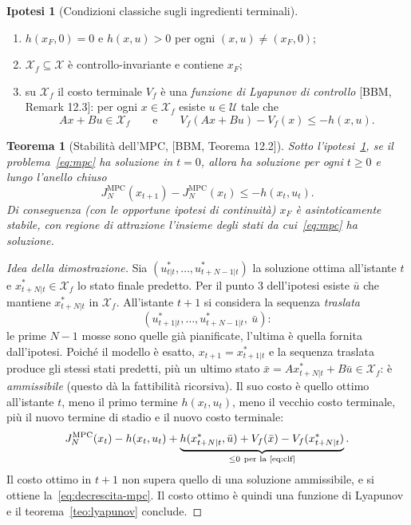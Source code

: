 \documentclass[11pt,a4paper]{article}
\theoremstyle{definition}
\newtheorem{ipotesi}[definizione]{Ipotesi}
\theoremstyle{plain}
\newtheorem{teorema}[definizione]{Teorema}
\theoremstyle{remark}
\newcommand{\Xc}{\mathcal{X}}
\newcommand{\Uc}{\mathcal{U}}
\newcommand{\Xf}{\mathcal{X}_f}
\newcommand{\libro}[1]{\textup{[BBM, #1]}} %
\begin{document}
\begin{ipotesi}[Condizioni classiche sugli ingredienti terminali]\label{ip:terminali}
\leavevmode
\begin{enumerate}
  \item $h(x_F,0)=0$ e $h(x,u)>0$ per ogni $(x,u)\ne(x_F,0)$;
  \item $\Xf\subseteq\Xc$ è controllo-invariante e contiene $x_F$;
  \item su $\Xf$ il costo terminale $V_f$ è una \emph{funzione di Lyapunov di
        controllo} \libro{Remark 12.3}: per ogni $x\in\Xf$ esiste $u\in\Uc$
        tale che
        \begin{equation}\label{eq:clf}
          Ax+Bu\in\Xf\qquad\text{e}\qquad V_f(Ax+Bu) - V_f(x)\le -h(x,u).
        \end{equation}
\end{enumerate}
\end{ipotesi}

\begin{teorema}[Stabilità dell'MPC, \libro{Teorema 12.2}]\label{teo:mpc}
Sotto l'ipotesi~\ref{ip:terminali}, se il problema~\eqref{eq:mpc} ha
soluzione in $t=0$, allora ha soluzione per ogni $t\ge 0$ e lungo l'anello
chiuso
\begin{equation}\label{eq:decrescita-mpc}
  J^{\mathrm{MPC}}_N(x_{t+1}) - J^{\mathrm{MPC}}_N(x_t) \le -h(x_t,u_t).
\end{equation}
Di conseguenza (con le opportune ipotesi di continuità) $x_F$ è
asintoticamente stabile, con regione di attrazione l'insieme degli stati da
cui~\eqref{eq:mpc} ha soluzione.
\end{teorema}
\begin{proof}[Idea della dimostrazione]
Sia $(u^*_{t|t},\dots,u^*_{t+N-1|t})$ la soluzione ottima all'istante $t$ e
$x^*_{t+N|t}\in\Xf$ lo stato finale predetto. Per il punto 3
dell'ipotesi esiste $\bar u$ che mantiene $x^*_{t+N|t}$ in $\Xf$. All'istante
$t+1$ si considera la sequenza \emph{traslata}
\[
  (u^*_{t+1|t},\dots,u^*_{t+N-1|t},\ \bar u):
\]
le prime $N-1$ mosse sono quelle già pianificate, l'ultima è quella fornita
dall'ipotesi. Poiché il modello è esatto, $x_{t+1}=x^*_{t+1|t}$ e la sequenza
traslata produce gli stessi stati predetti, più un ultimo stato
$\bar x = Ax^*_{t+N|t}+B\bar u\in\Xf$: è \emph{ammissibile} (questo dà la
fattibilità ricorsiva). Il suo costo è quello ottimo all'istante $t$, meno il
primo termine $h(x_t,u_t)$, meno il vecchio costo terminale, più il nuovo
termine di stadio e il nuovo costo terminale:
\[
  J^{\mathrm{MPC}}_N(x_t) - h(x_t,u_t)
  + \underbrace{h(x^*_{t+N|t},\bar u) + V_f(\bar x) - V_f(x^*_{t+N|t})}_{\le 0\ \text{per la~\eqref{eq:clf}}}.
\]
Il costo ottimo in $t+1$ non supera quello di una soluzione ammissibile, e
si ottiene la~\eqref{eq:decrescita-mpc}. Il costo ottimo è quindi una
funzione di Lyapunov e il teorema~\ref{teo:lyapunov} conclude.
\end{proof}
\end{document}
